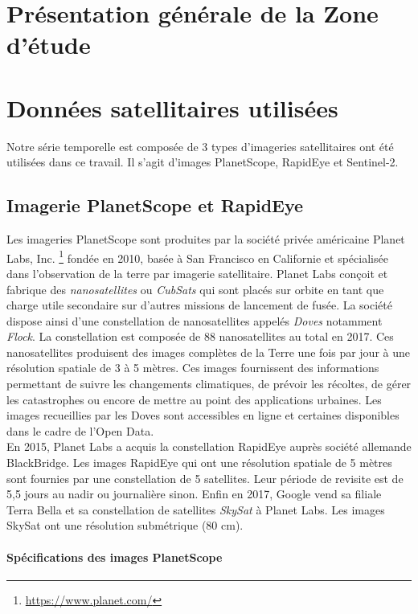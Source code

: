 \section{Présentation générale de la Zone d'étude}

\section{Données satellitaires utilisées}

Notre série temporelle est composée de 3 types d’imageries satellitaires ont été utilisées dans ce travail. Il s'agit d'images PlanetScope, RapidEye et Sentinel-2. 

  \subsection{Imagerie PlanetScope et RapidEye}
  
Les imageries PlanetScope sont produites par la société privée américaine Planet Labs, Inc. \footnote{\url{https://www.planet.com/}} fondée en 2010, basée à San Francisco 
en Californie et spécialisée dans l'observation de la terre par imagerie satellitaire. Planet Labs conçoit et fabrique des \emph{nanosatellites} ou \emph{CubSats} qui sont placés sur 
orbite en tant que charge utile secondaire sur d'autres missions de lancement de fusée. La société dispose ainsi d'une constellation de nanosatellites appelés \emph{Doves} notamment 
\emph{Flock}. La constellation est composée de 88 nanosatellites au total en 2017. Ces nanosatellites produisent des images complètes de la Terre une fois par jour à une résolution 
spatiale de 3 à 5 mètres. Ces images fournissent des informations permettant de suivre les changements climatiques, de prévoir les récoltes, de gérer les catastrophes ou encore de 
mettre au point des applications urbaines. Les images recueillies par les Doves sont accessibles en ligne et certaines disponibles dans le cadre de l'Open Data. \\
En 2015, Planet Labs a acquis la constellation RapidEye auprès société allemande BlackBridge. Les images RapidEye qui ont une résolution spatiale de 5 mètres sont fournies par une 
constellation de 5 satellites. Leur période de revisite est de 5,5 jours au nadir ou journalière sinon. Enfin en 2017, Google vend sa filiale Terra Bella et sa constellation de 
satellites \emph{SkySat} à Planet Labs. Les images SkySat ont une résolution submétrique (80 cm). 

    \paragraph{Spécifications des images PlanetScope}

